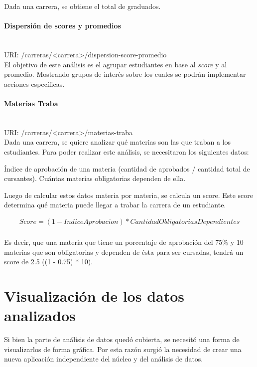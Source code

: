 Dada una carrera, se obtiene el total de graduados.


\paragraph{Dispersión de scores y promedios}\mbox{}\\
URI: /carreras/<carrera>/dispersion-score-promedio \\

El objetivo de este análisis es el agrupar estudiantes en base al \textit{score} y al promedio. Mostrando grupos de interés sobre los cuales se podrán implementar acciones específicas.

\paragraph{Materias Traba}\mbox{}\\

URI: /carreras/<carrera>/materias-traba \\

Dada una carrera, se quiere analizar qué materias son las que traban a los estudiantes. 
Para poder realizar este análisis, se necesitaron los siguientes datos:
\begin{outline}
\1 Índice de aprobación de una materia (cantidad de aprobados / cantidad total de cursantes).
\1 Cuántas materias obligatorias dependen de ella.
\end{outline}

Luego de calcular estos datos materia por materia, se calcula un score. Este score determina qué materia puede llegar a trabar la carrera de un estudiante.

\begin{align*}
  Score = (1 - IndiceAprobacion) * CantidadObligatoriasDependientes\\
\end{align*}

Es decir, que una materia que tiene un porcentaje de aprobación del 75\% y 10 materias que son obligatorias y dependen de ésta para ser cursadas, tendrá un score de 2.5 ((1 - 0.75) * 10).



\section[Visualización de los datos analizados]{Visualización de los datos analizados}

Si bien la parte de análisis de datos quedó cubierta, se necesitó una forma de visualizarlos de forma gráfica. Por esta razón surgió la necesidad de crear una nueva aplicación independiente del núcleo y del análisis de datos.

